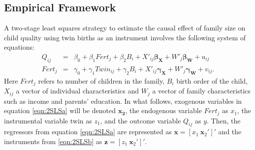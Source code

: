 \documentclass{article}[11pt,subeqn]
\newcommand{\vect}[1]{\mathbf{#1}}
\begin{document}
\begin{spacing}{1.5}
\section{Empirical Framework}
\label{scn:EF}
A two-stage least squares strategy to estimate the causal effect of family size on child quality using twin births as an instrument involves the following 
system of equations:
\begin{subequations}
\label{eqn:2SLS}
\begin{eqnarray}
\label{eqn:QQ}
Q_{ij}&=&\beta_0+\beta_1Fert_j+\beta_2B_{i}+X'_{ij}\vect{\beta_{\vect{X}}}+W'_j\vect{\beta_\vect{W}}+u_{ij} \label{eqn:2SLSa}\\
Fert_{j}&=&\gamma_0+\gamma_1Twin_{ij}+\gamma_2B_{i}+X'_{ij}\vect{\gamma_\vect{X}}+W'_j\vect{\gamma_\vect{W}}+v_{ij}. \label{eqn:2SLSb}
 \end{eqnarray}
\end{subequations}
Here $Fert_j$ refers to number of children in the family, $B_i$ birth order of the child, $X_{ij}$ a vector of individual characteristics and $W_j$ a vector 
of family characteristics such as income and parents' education.  In what follows, exogenous variables in equation \ref{eqn:2SLSa} will be denoted 
$\mathbf{x_2}$, the endogenous variable $Fert_j$ as $x_1$, the instrumental variable twin as $z_1$, and the outcome variable $Q_{ij}$ as $y$.  
Then, the regressors from equation \ref{eqn:2SLSa} are represented as $\vect{x}=[x_1\ \vect{x}_2']'$ and the instruments from \ref{eqn:2SLSb} as 
$\vect{z}=[z_1\ \vect{x}_2']'$.


\end{spacing}
\end{document}
